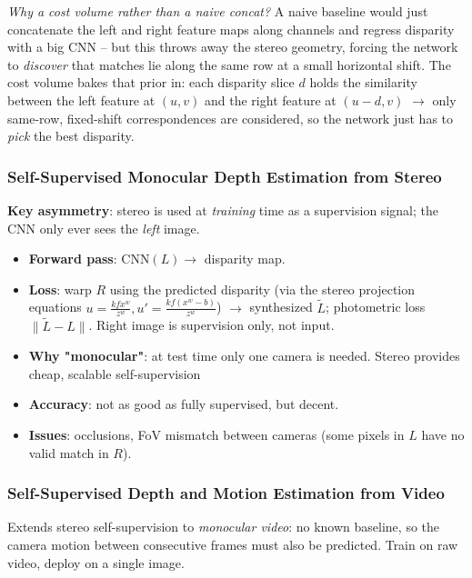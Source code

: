 \documentclass{article}
\begin{document}
\vspace{-0.5cm}
\textit{Why a cost volume rather than a naive concat?} A naive baseline would just concatenate the left and right feature maps along channels and regress disparity with a big CNN -- but this throws away the stereo geometry, forcing the network to \textit{discover} that matches lie along the same row at a small horizontal shift. The cost volume bakes that prior in: each disparity slice $d$ holds the similarity between the left feature at $(u,v)$ and the right feature at $(u-d, v)$ $\rightarrow$ only same-row, fixed-shift correspondences are considered, so the network just has to \textit{pick} the best disparity.

\subsubsection{Self-Supervised Monocular Depth Estimation from Stereo}
\textbf{Key asymmetry}: stereo is used at \textit{training} time as a supervision signal; the CNN only ever sees the \textit{left} image.
\begin{itemize}
    \item \textbf{Forward pass}: $\text{CNN}(L) \rightarrow$ disparity map.
    \item \textbf{Loss}: warp $R$ using the predicted disparity (via the stereo projection equations $u = \tfrac{kfx^w}{z^w}, u' = \tfrac{kf(x^w-b)}{z^w}$) $\rightarrow$ synthesized $\tilde L$; photometric loss $\lVert \tilde L - L\rVert$. Right image is supervision only, not input.
    \item \textbf{Why "monocular"}: at test time only one camera is needed. Stereo provides cheap, scalable self-supervision
    \item \textbf{Accuracy}: not as good as fully supervised, but decent.
    \item \textbf{Issues}: occlusions, FoV mismatch between cameras (some pixels in $L$ have no valid match in $R$).
\end{itemize}

\subsubsection{Self-Supervised Depth and Motion Estimation from Video}
Extends stereo self-supervision to \textit{monocular video}: no known baseline, so the camera motion between consecutive frames must also be predicted. Train on raw video, deploy on a single image.
\vspace{-0.3cm}
\end{document}
